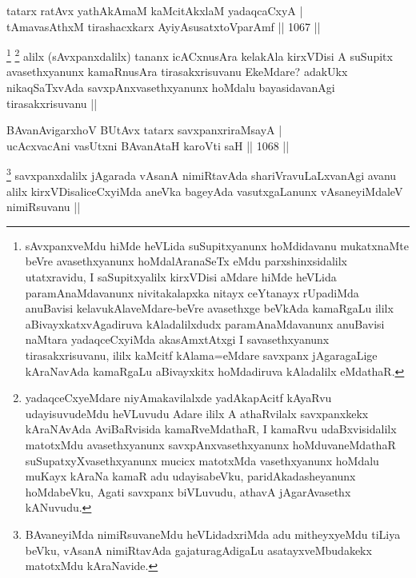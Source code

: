 \begin{shl}
tatarx ratAvx yathAkAmaM kaMcitAkxlaM yadaqcaCxyA | \\
tAmavasAthxM tirashacxkarx AyiyAsusatxtoV\s parAmf \hfill||  1067 ||  
\end{shl}

\begin{artha}
\footnote{sAvxpanxveMdu hiMde heVLida suSupitxyanunx hoMdidavanu mukatxnaMte beVre avasethxyanunx hoMdalAranaSeTx eMdu parxshinxsidalilx utatxravidu, I saSupitxyalilx kirxVDisi aMdare hiMde heVLida paramAnaMdavanunx nivitakalapxka nitayx ceYtanayx rUpadiMda anuBavisi kelavukAlaveMdare-beVre avasethxge beVkAda kamaRgaLu ililx aBivayxkatxvAgadiruva kAladalilxdudx paramAnaMdavanunx anuBavisi naMtara yadaqceCxyiMda akasAmxtAtxgi I savasethxyanunx tirasakxrisuvanu, ililx kaMcitf kAlama=eMdare savxpanx jAgaragaLige kAraNavAda kamaRgaLu aBivayxkitx hoMdadiruva kAladalilx eMdathaR.}
\footnote{yadaqceCxyeMdare niyAmakavilalxde yadAkapAcitf kAyaRvu udayisuvudeMdu heVLuvudu Adare ililx A athaRvilalx savxpanxkekx kAraNAvAda AviBaRvisida kamaRveMdathaR, I kamaRvu udaBxvisidalilx matotxMdu avasethxyanunx savxpAnxvasethxyanunx hoMduvaneMdathaR suSupatxyXvasethxyanunx mucicx matotxMda vasethxyanunx hoMdalu muKayx kAraNa kamaR adu udayisabeVku, paridAkadasheyanunx hoMdabeVku, Agati savxpanx biVLuvudu, athavA jAgarAvasethx kANuvudu.}
alilx (sAvxpanxdalilx) tananx icACxnusAra kelakAla kirxVDisi A suSupitx avasethxyanunx kamaRnusAra tirasakxrisuvanu EkeMdare? adakUkx nikaqSaTxvAda savxpAnxvasethxyanunx hoMdalu bayasidavanAgi tirasakxrisuvanu ||
\end{artha}


\begin{shl}
BAvanAvigarxhoV BUtAvx tatarx savxpanxriraMsayA | \\
ucAcxvacAni vasUtxni BAvanAtaH karoVti saH \hfill||  1068 ||  
\end{shl}

\begin{artha}
\footnote{BAvaneyiMda nimiRsuvaneMdu heVLidadxriMda adu mitheyxyeMdu tiLiya beVku, vAsanA nimiRtavAda gajaturagAdigaLu asatayxveMbudakekx matotxMdu kAraNavide.}
savxpanxdalilx jAgarada vAsanA nimiRtavAda shariVravuLaLxvanAgi avanu alilx kirxVDisaliceCxyiMda aneVka bageyAda vasutxgaLanunx vAsaneyiMdaleV nimiRsuvanu ||
\end{artha}

